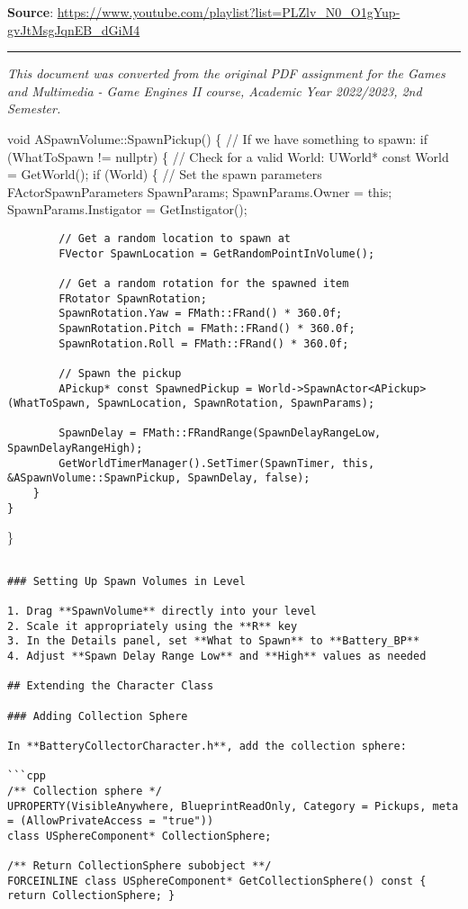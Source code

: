 \documentclass[
  letterpaper,
  DIV=11,
  numbers=noendperiod]{scrartcl}
\begin{document}
\textbf{Source}:
\url{https://www.youtube.com/playlist?list=PLZlv_N0_O1gYup-gvJtMsgJqnEB_dGiM4}

\begin{center}\rule{0.5\linewidth}{0.5pt}\end{center}

\emph{This document was converted from the original PDF assignment for
the Games and Multimedia - Game Engines II course, Academic Year
2022/2023, 2nd Semester.}

void ASpawnVolume::SpawnPickup() \{ // If we have something to spawn: if
(WhatToSpawn != nullptr) \{ // Check for a valid World: UWorld* const
World = GetWorld(); if (World) \{ // Set the spawn parameters
FActorSpawnParameters SpawnParams; SpawnParams.Owner = this;
SpawnParams.Instigator = GetInstigator();

\begin{verbatim}
        // Get a random location to spawn at
        FVector SpawnLocation = GetRandomPointInVolume();
        
        // Get a random rotation for the spawned item
        FRotator SpawnRotation;
        SpawnRotation.Yaw = FMath::FRand() * 360.0f;
        SpawnRotation.Pitch = FMath::FRand() * 360.0f;
        SpawnRotation.Roll = FMath::FRand() * 360.0f;
        
        // Spawn the pickup
        APickup* const SpawnedPickup = World->SpawnActor<APickup>(WhatToSpawn, SpawnLocation, SpawnRotation, SpawnParams);
        
        SpawnDelay = FMath::FRandRange(SpawnDelayRangeLow, SpawnDelayRangeHigh);
        GetWorldTimerManager().SetTimer(SpawnTimer, this, &ASpawnVolume::SpawnPickup, SpawnDelay, false);
    }
}
\end{verbatim}

\}

\begin{verbatim}

### Setting Up Spawn Volumes in Level

1. Drag **SpawnVolume** directly into your level
2. Scale it appropriately using the **R** key
3. In the Details panel, set **What to Spawn** to **Battery_BP**
4. Adjust **Spawn Delay Range Low** and **High** values as needed

## Extending the Character Class

### Adding Collection Sphere

In **BatteryCollectorCharacter.h**, add the collection sphere:

```cpp
/** Collection sphere */
UPROPERTY(VisibleAnywhere, BlueprintReadOnly, Category = Pickups, meta = (AllowPrivateAccess = "true"))
class USphereComponent* CollectionSphere;

/** Return CollectionSphere subobject **/
FORCEINLINE class USphereComponent* GetCollectionSphere() const { return CollectionSphere; }
\end{verbatim}
\end{document}
